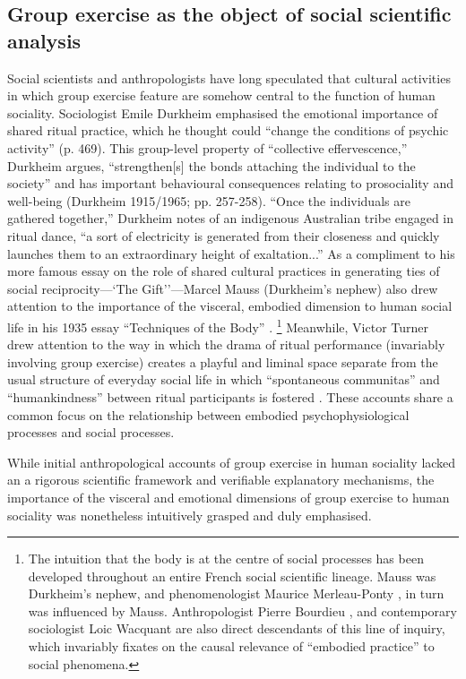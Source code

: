 \begin{CJK}{UTF8}{gbsn}
\subsection{Group exercise as the object of social scientific analysis\label{sect:GEsoSci}}
Social scientists and anthropologists have long speculated that cultural activities in which group exercise feature are somehow central to the function of human sociality.  Sociologist Emile Durkheim emphasised the emotional importance of shared ritual practice, which he thought could ``change the conditions of psychic activity'' (p. 469).  This group-level property of ``collective effervescence,'' Durkheim argues, ``strengthen[s] the bonds attaching the individual to the society'' and has important behavioural consequences relating to prosociality and well-being (Durkheim 1915/1965; pp. 257-258). ``Once the individuals are gathered together,'' Durkheim notes of an indigenous Australian tribe engaged in ritual dance, ``a sort of electricity is generated from their closeness and quickly launches them to an extraordinary height of exaltation...''  As a compliment to his more famous essay on the role of shared cultural practices in generating ties of social reciprocity---`The Gift''---Marcel Mauss (Durkheim's nephew) also drew attention to the importance of the visceral, embodied dimension to human social life in his 1935 essay ``Techniques of the Body'' \citep{Mauss1935}.
    \footnote{The intuition that the body is at the centre of social processes has been developed throughout an entire French social scientific lineage.  Mauss was Durkheim's nephew, and phenomenologist Maurice Merleau-Ponty \citep{Merleau-Ponty1956}, in turn was influenced by Mauss.  Anthropologist Pierre Bourdieu \citep{Bourdieu1990}, and contemporary sociologist Loic Wacquant \citep{Wacquant2004} are also direct descendants of this line of inquiry, which invariably fixates on the causal relevance of ``embodied practice'' to social phenomena.}
Meanwhile, Victor Turner drew attention to the way in which the drama of ritual performance (invariably involving group exercise) creates a playful and liminal space separate from the usual structure of everyday social life in which ``spontaneous communitas'' and ``humankindness'' between ritual participants is fostered \citep{Turner1974}.  These accounts share a common focus on the relationship between embodied psychophysiological processes and social processes.

While initial anthropological accounts of group exercise in human sociality lacked an a rigorous scientific framework and verifiable explanatory mechanisms, the importance of the visceral and emotional dimensions of group exercise to human sociality was nonetheless intuitively grasped and duly emphasised.


\end{CJK}
